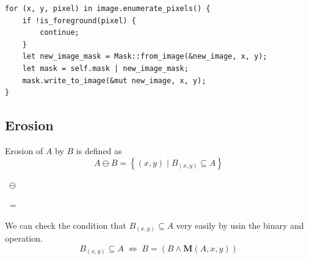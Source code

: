 \documentclass[12pt]{article}
\begin{document}
\begin{lstlisting}
for (x, y, pixel) in image.enumerate_pixels() {
    if !is_foreground(pixel) {
        continue;
    }
    let new_image_mask = Mask::from_image(&new_image, x, y);
    let mask = self.mask | new_image_mask;
    mask.write_to_image(&mut new_image, x, y);
}
\end{lstlisting}

\subsection{Erosion}

Erosion of $A$ by $B$ is defined as
\begin{equation}
    A \ominus B = \left\{ (x,y) \mid B_{(x,y)} \subseteq A \right\}
    \label{eq:erosion-formal-def}
\end{equation}

\begin{center}
    $\; \ominus \; $
    $\; = \; $
\end{center}

We can check the condition that $B_{(x,y)} \subseteq A$ very easily by usin the binary and operation.
\begin{equation}
    B_{(x,y)} \subseteq A \;\Leftrightarrow\; B = \left( B \land \mathbf{M}(A,x,y) \right)
\end{equation}
\end{document}
